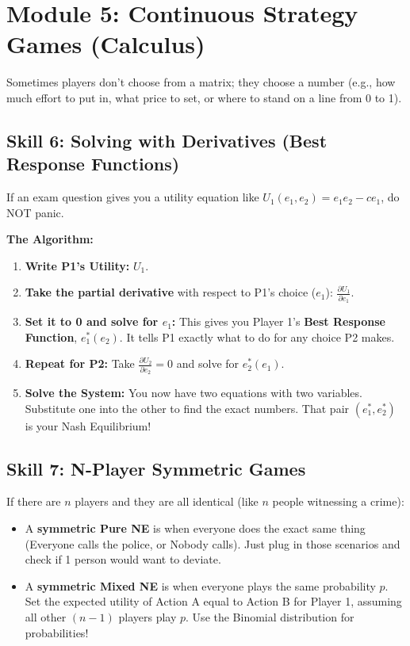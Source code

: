 \documentclass[12pt, a4paper]{article}
\begin{document}
\section{Module 5: Continuous Strategy Games (Calculus)}

Sometimes players don't choose from a matrix; they choose a number (e.g., how much effort to put in, what price to set, or where to stand on a line from 0 to 1). 

\subsection{Skill 6: Solving with Derivatives (Best Response Functions)}
If an exam question gives you a utility equation like $U_1(e_1, e_2) = e_1 e_2 - c e_1$, do NOT panic. 

\textbf{The Algorithm:}
\begin{enumerate}
    \item \textbf{Write P1's Utility:} $U_1$.
    \item \textbf{Take the partial derivative} with respect to P1's choice ($e_1$): $\frac{\partial U_1}{\partial e_1}$.
    \item \textbf{Set it to 0 and solve for $e_1$:} This gives you Player 1's \textbf{Best Response Function}, $e_1^*(e_2)$. It tells P1 exactly what to do for any choice P2 makes.
    \item \textbf{Repeat for P2:} Take $\frac{\partial U_2}{\partial e_2} = 0$ and solve for $e_2^*(e_1)$.
    \item \textbf{Solve the System:} You now have two equations with two variables. Substitute one into the other to find the exact numbers. That pair $(e_1^*, e_2^*)$ is your Nash Equilibrium!
\end{enumerate}

\subsection{Skill 7: N-Player Symmetric Games}
If there are $n$ players and they are all identical (like $n$ people witnessing a crime):
\begin{itemize}
    \item A \textbf{symmetric Pure NE} is when everyone does the exact same thing (Everyone calls the police, or Nobody calls). Just plug in those scenarios and check if 1 person would want to deviate.
    \item A \textbf{symmetric Mixed NE} is when everyone plays the same probability $p$. Set the expected utility of Action A equal to Action B for Player 1, assuming all other $(n-1)$ players play $p$. Use the Binomial distribution for probabilities!
\end{itemize}
\end{document}
